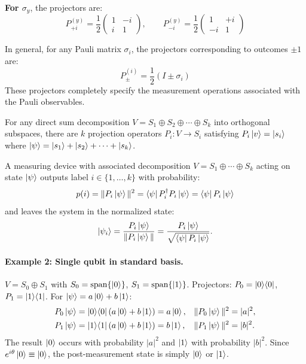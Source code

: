 \documentclass[10pt,a4paper]{article}
\begin{document}
\textbf{For $\sigma_y$}, the projectors are:
\begin{equation}
    P_{+i}^{(y)} = \frac{1}{2}\begin{pmatrix} 1 & -i \\ i & 1 \end{pmatrix}, \qquad
    P_{-i}^{(y)} = \frac{1}{2}\begin{pmatrix} 1 & +i \\ -i & 1 \end{pmatrix}
\end{equation}

In general, for any Pauli matrix $\sigma_i$, the projectors corresponding to outcomes $\pm 1$ are:
\begin{equation}
    P_{\pm}^{(i)} = \frac{1}{2}(I \pm \sigma_i)
\end{equation}
These projectors completely specify the measurement operations associated with the Pauli observables.

For any direct sum decomposition $V=S_1\oplus S_2\oplus\cdots\oplus S_k$ into orthogonal subspaces, there are $k$ projection operators $P_i:V\to S_i$ satisfying $P_i\ket{v}=\ket{s_i}$ where $\ket{\psi}=\ket{s_1}+\ket{s_2}+\cdots+\ket{s_k}$.

\begin{tcolorbox}[propstyle, title={Measurement Postulate (Complete Projective Form)}]
A measuring device with associated decomposition $V=S_1\oplus\cdots\oplus S_k$ acting on state $\ket{\psi}$ outputs label $i\in\{1,\dots,k\}$ with probability:
\[
p(i) = \|P_i\ket{\psi}\|^2 = \bra{\psi}P_i^\dagger P_i\ket{\psi} = \bra{\psi}P_i\ket{\psi}
\]
and leaves the system in the normalized state:
\[
\ket{\psi_i} = \frac{P_i\ket{\psi}}{\|P_i\ket{\psi}\|} = \frac{P_i\ket{\psi}}{\sqrt{\bra{\psi}P_i\ket{\psi}}}.
\]
\end{tcolorbox}

\paragraph{Example 2: Single qubit in standard basis.}
$V=S_0\oplus S_1$ with $S_0=\mathrm{span}\{\ket{0}\}$, $S_1=\mathrm{span}\{\ket{1}\}$. Projectors: $P_0=\ket{0}\!\bra{0}$, $P_1=\ket{1}\!\bra{1}$. For $\ket{\psi}=a\ket{0}+b\ket{1}$:
\begin{align*}
P_0\ket{\psi} &= \ket{0}\!\bra{0}(a\ket{0}+b\ket{1}) = a\ket{0}, & \|P_0\ket{\psi}\|^2 &= |a|^2,\\
P_1\ket{\psi} &= \ket{1}\!\bra{1}(a\ket{0}+b\ket{1}) = b\ket{1}, & \|P_1\ket{\psi}\|^2 &= |b|^2.
\end{align*}
The result $\ket{0}$ occurs with probability $|a|^2$ and $\ket{1}$ with probability $|b|^2$. Since $e^{i\theta}\ket{0}\equiv\ket{0}$, the post-measurement state is simply $\ket{0}$ or $\ket{1}$.
\end{document}
